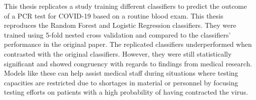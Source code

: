 This thesis replicates a study training different classifiers to predict the 
outcome of a PCR test for COVID-19 based on a routine blood exam. This thesis 
reproduces the Random Forest and Logistic Regression classifiers. They were 
trained using 5-fold nested cross validation and compared to the classifiers' 
performance in the original paper. The replicated classifiers underperformed 
when contrasted with the original classifiers. However, they were still 
statistically significant and showed congruency with regards to findings from 
medical research. Models like these can help assist medical staff during 
situations where testing capacities are restricted due to shortages in material 
or personnel by focusing testing efforts on patients with a high probability of 
having contracted the virus.
